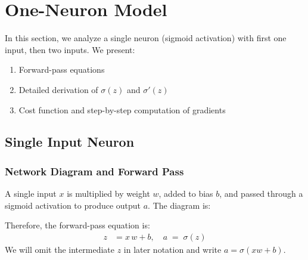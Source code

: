 \documentclass{article}
\begin{document}
\section{One-Neuron Model}

\noindent In this section, we analyze a single neuron (sigmoid activation) with first one input, then two inputs.  We present:
\begin{enumerate}
    \item Forward-pass equations
    \item Detailed derivation of \(\sigma(z)\) and \(\sigma'(z)\)
    \item Cost function and step-by-step computation of gradients
\end{enumerate}

\subsection{Single Input Neuron}\label{sec:one-neuron-single-input}

\subsubsection{Network Diagram and Forward Pass}\label{sec:one-neuron-forward}

\noindent A single input \(x\) is multiplied by weight \(w\), added to bias \(b\), and passed through a sigmoid activation to produce output \(a\).  The diagram is:

\begin{center}
\end{center}

\noindent Therefore, the forward-pass equation is:
\begin{align}
    z 
    &= x\,w + b, 
    \quad
    a \;=\; \sigma(z)
    \label{eq:one-neuron-forward}
\end{align}
\noindent We will omit the intermediate \(z\) in later notation and write \(a = \sigma(x w + b)\).
\end{document}
